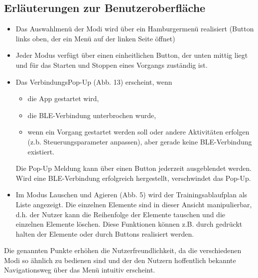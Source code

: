 \documentclass[a4paper,12pt]{article}
\begin{document}
\subsection{Erläuterungen zur Benutzeroberfläche}
\begin{itemize}
  \item Das Auswahlmenü der Modi wird über ein Hamburgermenü realisiert (Button links oben, der ein Menü auf der linken Seite öffnet)
  \item Jeder Modus verfügt über einen einheitlichen Button, der unten mittig liegt und für das Starten und Stoppen eines Vorgangs zuständig ist.
  \item {Das VerbindungsPop-Up (Abb. 13) erscheint, wenn 
  \begin{itemize}
    \item die App gestartet wird,
    \item die BLE-Verbindung unterbrochen wurde,
    \item wenn ein Vorgang gestartet werden soll oder andere Aktivitäten erfolgen (z.b. \Gls{Steuerungsparameter} anpassen), aber gerade keine BLE-Verbindung existiert.
  \end{itemize}
  Die Pop-Up Meldung kann über einen Button jederzeit ausgeblendet werden. 
  Wird eine BLE-Verbindung erfolgreich hergestellt, verschwindet das Pop-Up.
  }
  \item Im Modus Lauschen und Agieren (Abb. 5) wird der Trainingsablaufplan als Liste angezeigt. Die einzelnen Elemente sind in dieser Ansicht manipulierbar, d.h. der Nutzer kann die Reihenfolge der Elemente tauschen und die einzelnen Elemente löschen. Diese Funktionen können z.B. durch gedrückt halten der Elemente oder durch Buttons realisiert werden.
\end{itemize}
Die genannten Punkte erhöhen die Nutzerfreundlichkeit, da die verschiedenen Modi so ähnlich zu bedienen sind und der den Nutzern hoffentlich bekannte Navigationsweg über das Menü intuitiv erscheint.
\end{document}
